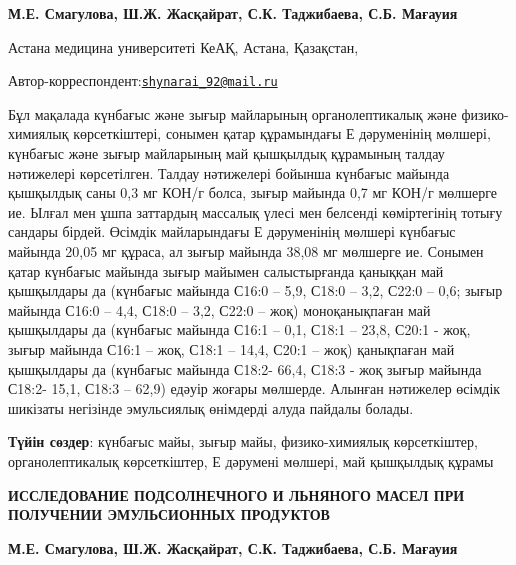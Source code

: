 
\begin{articleheader}

{\bfseries
М.Е. Смагулова,
Ш.Ж. Жасқайрат\textsuperscript{\envelope },
С.К. Таджибаева,
С.Б. Мағауия
}
\end{articleheader}

\begin{affiliation}
Астана медицина университеті КеАҚ, Астана, Қазақстан,

\raggedright \textsuperscript{\envelope }Автор-корреспондент:\href{mailto:shynarai\_92@mail.ru}{\nolinkurl{shynarai\_92@mail.ru}}
\end{affiliation}

Бұл мақалада күнбағыс және зығыр майларының органолептикалық және
физико-химиялық көрсеткіштері, сонымен қатар құрамындағы Е дәруменінің
мөлшері, күнбағыс және зығыр майларының май қышқылдық құрамының талдау
нәтижелері көрсетілген. Талдау нәтижелері бойынша күнбағыс майында
қышқылдық саны 0,3 мг КОН/г болса, зығыр майында 0,7 мг КОН/г мөлшерге
ие. Ылғал мен ұшпа заттардың массалық үлесі мен белсенді көміртегінің
тотығу сандары бірдей. Өсімдік майларындағы Е дәруменінің мөлшері
күнбағыс майында 20,05 мг құраса, ал зығыр майында 38,08 мг мөлшерге ие.
Сонымен қатар күнбағыс майында зығыр майымен салыстырғанда қаныққан май
қышқылдары да (күнбағыс майында С16:0 -- 5,9, С18:0 -- 3,2, С22:0 --
0,6; зығыр майында С16:0 -- 4,4, С18:0 -- 3,2, С22:0 -- жоқ)
моноқанықпаған май қышқылдары да (күнбағыс майында С16:1 -- 0,1, С18:1
-- 23,8, С20:1 - жоқ, зығыр майында С16:1 -- жоқ, С18:1 -- 14,4, С20:1
-- жоқ) қанықпаған май қышқылдары да (күнбағыс майында С18:2- 66,4,
С18:3 - жоқ зығыр майында С18:2- 15,1, С18:3 -- 62,9) едәуір жоғары
мөлшерде. Алынған нәтижелер өсімдік шикізаты негізінде эмульсиялық
өнімдерді алуда пайдалы болады.

{\bfseries Түйін сөздер}: күнбағыс майы, зығыр майы, физико-химиялық
көрсеткіштер, органолептикалық көрсеткіштер, Е дәрумені мөлшері, май
қышқылдық құрамы

\begin{articleheader}
{\bfseries ИССЛЕДОВАНИЕ ПОДСОЛНЕЧНОГО И ЛЬНЯНОГО МАСЕЛ ПРИ ПОЛУЧЕНИИ
ЭМУЛЬСИОННЫХ ПРОДУКТОВ}

{\bfseries
М.Е. Смагулова,
Ш.Ж. Жасқайрат\textsuperscript{\envelope },
С.К. Таджибаева,
С.Б. Мағауия
}
\end{articleheader}

